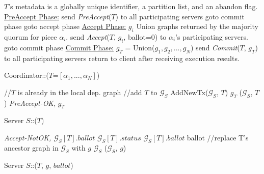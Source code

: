 \begin{algorithm}
  \DontPrintSemicolon
  $T$'s metadata is a globally unique identifier, a partition list, and an abandon flag. \;
  \underline{PreAccept Phase:}\;
  send \emph{PreAccept}($T$) to all participating servers \;
   {
    goto commit phase \;
  }  {
        goto accept phase \;
  } 
  \underline{Accept Phase:} \;
   {
      $g_i$ \LAR Union graphs returned by the majority quorum for piece $\alpha_i$.
    }
   {
	  send \emph{Accept}($T$, $g_i$, ballot=0) to $\alpha_i$'s participating servers.
  }
   {
	  goto commit phase \;
  } 
  \underline{Commit Phase:} \;
  $g_{T}$ = Union($g_1, g_2, ..., g_N$) \;
  send {\em Commit}($T$, $g_{T}$) to all participating servers \;
  return to client after receiving execution results. 
  \caption{Coordinator::($T$=$[\alpha_1,...,\alpha_N]$) }
  \label{alg:coordinator}
\end{algorithm}


\begin{algorithm}
  \DontPrintSemicolon
   { 
	//$T$ is already in the local dep. graph \;
	\;
  } 
  //add $T$ to $\mathcal{G}_S$ \;
  {\sc AddNewTx}($\mathcal{G}_S$, $T$) \;
  $g_T$ ($\mathcal{G}_S$, $T$)\;
  \Return \emph{PreAccept-OK}, $g_{T}$ \;
  \caption{Server $S$::($T$)}
  \label{alg:preaccept}
\end{algorithm}


\begin{algorithm}
  \DontPrintSemicolon
   {
	  \Return \em{Accept-NotOK}, $\mathcal{G}_S[T].ballot$\;
  }
  $\mathcal{G}_S[T].status$ \;
  $\mathcal{G}_S[T].ballot$ \LAR ballot\;
  //replace T's ancestor graph in $\mathcal{G}_S$ with $g$\;
  $\mathcal{G}_S$ ($\mathcal{G}_S$, $g$)\;
  \caption{Server $S$::($T$, $g$, $ballot$)}
  \label{alg:accept}
\end{algorithm}







